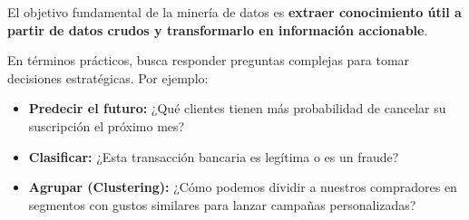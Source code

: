 El objetivo fundamental de la minería de datos es \textbf{extraer conocimiento útil a partir de datos crudos y transformarlo en información accionable}. 

En términos prácticos, busca responder preguntas complejas para tomar decisiones estratégicas. Por ejemplo:
\begin{itemize}
    \item \textbf{Predecir el futuro:} ¿Qué clientes tienen más probabilidad de cancelar su suscripción el próximo mes?
    \item \textbf{Clasificar:} ¿Esta transacción bancaria es legítima o es un fraude?
    \item \textbf{Agrupar (Clustering):} ¿Cómo podemos dividir a nuestros compradores en segmentos con gustos similares para lanzar campañas personalizadas?
\end{itemize}